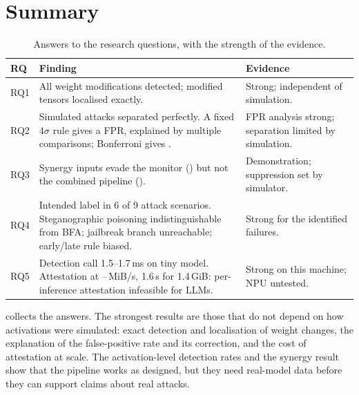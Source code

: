 \section{Summary}
\label{sec:eval:summary}

\begin{table}[t]
\centering
\caption{Answers to the research questions, with the strength of the evidence.}
\label{tab:rq_summary}
\small
\begin{tabularx}{\textwidth}{@{}p{1.2cm}Xp{3.2cm}@{}}
\toprule
\textbf{RQ} & \textbf{Finding} & \textbf{Evidence} \\
\midrule
RQ1 & All weight modifications detected; modified tensors localised exactly. & Strong; independent of simulation. \\
RQ2 & Simulated attacks separated perfectly. A fixed $4\sigma$ rule gives a \EmpFPRZFour{} FPR, explained by multiple comparisons; Bonferroni gives \EmpFPRBonf{}. & FPR analysis strong; separation limited by simulation. \\
RQ3 & Synergy inputs evade the monitor (\MonSynergy{}) but not the combined pipeline (\FlagSynergy{}). & Demonstration; suppression set by simulator. \\
RQ4 & Intended label in 6 of 9 attack scenarios. Steganographic poisoning indistinguishable from BFA; jailbreak branch unreachable; early/late rule biased. & Strong for the identified failures. \\
RQ5 & Detection call 1.5--1.7\,ms on tiny model. Attestation at \MerkThrMin{}--\MerkThrMax{}\,MiB/s, 1.6\,s for 1.4\,GiB: per-inference attestation infeasible for LLMs. & Strong on this machine; NPU untested. \\
\bottomrule
\end{tabularx}
\end{table}

 collects the answers. The strongest results are those that do not depend
on how activations were simulated: exact detection and localisation of weight changes, the
explanation of the false-positive rate and its correction, and the cost of attestation at scale.
The activation-level detection rates and the synergy result show that the pipeline works as
designed, but they need real-model data before they can support claims about real attacks.
